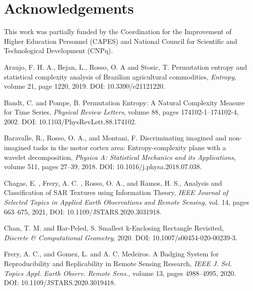\documentclass[a4,11pt]{pssbmac}
\begin{document}
	\section*{Acknowledgements}
	
	This work was partially funded by the Coordination for the Improvement of Higher Education Personnel (CAPES) and National Council for Scientific and Technological Development (CNPq).
	
	\begin{thebibliography}{00}
		
		 Araujo, F. H. A., Bejan, L., Rosso, O. A and Stosic, T. 
		Permutation entropy and statistical complexity analysis of Brazilian agricultural commodities, 
		{\it Entropy}, 
		volume 21, 
		page 1220,
		2019. 
		DOI: 10.3390/e21121220.
		
		 Bandt, C. and Pompe, B.
		Permutation Entropy: A Natural Complexity Measure for Time Series,
		{\it Physical Review Letters}, 
		volume 88, 
		pages 174102-1--174102-4,
		2002.
		DOI: 10.1103/PhysRevLett.88.174102.
		
		 Baravalle, R., Rosso, O. A., and Montani, F. 
		Discriminating imagined and non-imagined tasks in the motor cortex area: Entropy-complexity plane with a wavelet decomposition, 
		{\it Physica A: Statistical Mechanics and its Applications}, 
		volume 511, 
		pages 27--39,
		2018. 
		DOI: 10.1016/j.physa.2018.07.038.
		
		Chagas, E. , Frery, A. C. , Rosso, O. A., and Ramos, H. S., Analysis and Classification of SAR Textures using Information Theory, \textit{IEEE Journal of Selected Topics in Applied Earth Observations and Remote Sensing}, vol. 14, pages 663--675, 2021, DOI: 10.1109/JSTARS.2020.3031918.
		
		
		 Chan, T. M. and Har-Peled, S.
		Smallest k-Enclosing Rectangle Revisited,
		{\it Discrete {\&} Computational Geometry},
		2020. 
		DOI: 10.1007/s00454-020-00239-3.
		
		 Frery, A. C., and Gomez, L. and A. C. Medeiros.
		A Badging System for Reproducibility and Replicability in Remote Sensing Research,
		{\it IEEE J. Sel. Topics Appl. Earth Observ. Remote Sens.}, 
		volume 13, 
		pages 4988--4995,
		2020.
		DOI: 10.1109/JSTARS.2020.3019418.
		

\end{thebibliography}
\end{document}
